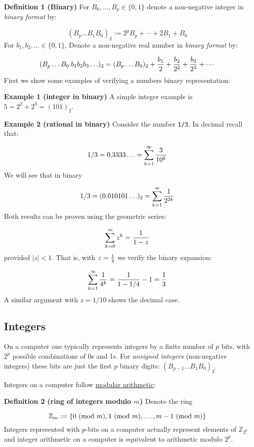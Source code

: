 \documentclass[12pt,a4paper]{article}
\begin{document}
\textbf{Definition 1 (Binary)} For $B_0,\ldots,B_p \in \{0,1\}$ denote a non-negative integer in \emph{binary format} by:

\[
(B_p\ldots B_1B_0)_2 := 2^pB_p + \cdots + 2B_1 + B_0
\]
For $b_1,b_2,\ldots \in \{0,1\}$, Denote a non-negative real number in \emph{binary format} by:

\[
(B_p \ldots B_0.b_1b_2b_3\ldots)_2 = (B_p \ldots B_0)_2 + {b_1 \over 2} + {b_2 \over 2^2} + {b_3 \over 2^3} + \cdots
\]
First we show some examples of verifying a numbers binary representation:

\textbf{Example 1 (integer in binary)} A simple integer example is $5 = 2^2 + 2^0 = (101)_2$.

\textbf{Example 2 (rational in binary)} Consider the number \texttt{1/3}.  In decimal recall that:

\[
1/3 = 0.3333\ldots =  \sum_{k=1}^\ensuremath{\infty} {3 \over 10^k}
\]
We will see that in binary

\[
1/3 = (0.010101\ldots)_2 = \sum_{k=1}^\ensuremath{\infty} {1 \over 2^{2k}}
\]
Both results can be proven using the geometric series:

\[
\sum_{k=0}^\ensuremath{\infty} z^k = {1 \over 1 - z}
\]
provided $|z| < 1$. That is, with $z = {1 \over 4}$ we verify the binary expansion:

\[
\sum_{k=1}^\ensuremath{\infty} {1 \over 4^k} = {1 \over 1 - 1/4} - 1 = {1 \over 3}
\]
A similar argument with $z = 1/10$ shows the decimal case.

\subsection{Integers}
On a computer one typically represents integers by a finite number of $p$ bits, with $2^p$ possible combinations of 0s and 1s. For \emph{unsigned integers} (non-negative integers) these bits are just the first $p$ binary digits: $(B_{p-1}\ldots B_1B_0)_2$.

Integers on a computer follow \href{https://en.wikipedia.org/wiki/Modular_arithmetic}{modular arithmetic}:

\textbf{Definition 2 (ring of integers modulo $m$)} Denote the ring

\[
{\mathbb Z}_{m} := \{0 \ ({\rm mod}\ m), 1 \ ({\rm mod}\ m), \ldots, m-1 \ ({\rm mod}\ m) \}
\]
Integers represented with $p$-bits on a computer actually represent elements of ${\mathbb Z}_{2^p}$ and integer arithmetic on a computer is equivalent to arithmetic modulo $2^p$.
\end{document}
